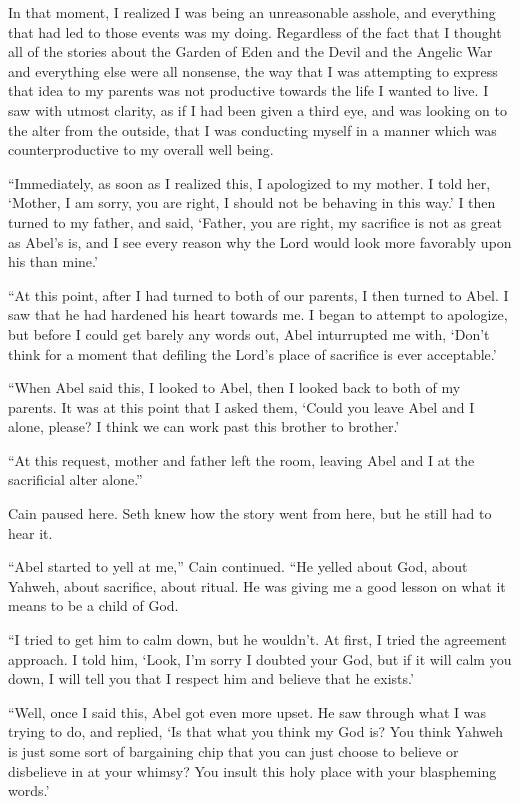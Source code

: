 \documentclass[12pt,twoside,titlepage]{report}
\begin{document}
In that moment, I realized I was being an unreasonable asshole, and
everything that had led to those events was my doing. Regardless of the
fact that I thought all of the stories about the Garden of Eden and the
Devil and the Angelic War and everything else were all nonsense, the way
that I was attempting to express that idea to my parents was not
productive towards the life I wanted to live. I saw with utmost clarity,
as if I had been given a third eye, and was looking on to the alter from
the outside, that I was conducting myself in a manner which was
counterproductive to my overall well being.

``Immediately, as soon as I realized this, I apologized to my mother. I
told her, `Mother, I am sorry, you are right, I should not be behaving
in this way.' I then turned to my father, and said, `Father, you are
right, my sacrifice is not as great as Abel's is, and I see every reason
why the Lord would look more favorably upon his than mine.'

``At this point, after I had turned to both of our parents, I then
turned to Abel. I saw that he had hardened his heart towards me. I began
to attempt to apologize, but before I could get barely any words out,
Abel inturrupted me with, `Don't think for a moment that defiling the
Lord's place of sacrifice is ever acceptable.'

``When Abel said this, I looked to Abel, then I looked back to both of
my parents. It was at this point that I asked them, `Could you leave
Abel and I alone, please? I think we can work past this brother to
brother.'

``At this request, mother and father left the room, leaving Abel and I
at the sacrificial alter alone.''

Cain paused here. Seth knew how the story went from here, but he still
had to hear it.

``Abel started to yell at me,'' Cain continued. ``He yelled about God,
about Yahweh, about sacrifice, about ritual. He was giving me a good
lesson on what it means to be a child of God.

``I tried to get him to calm down, but he wouldn't. At first, I tried
the agreement approach. I told him, `Look, I'm sorry I doubted your God,
but if it will calm you down, I will tell you that I respect him and
believe that he exists.'

``Well, once I said this, Abel got even more upset. He saw through what
I was trying to do, and replied, `Is that what you think my God is? You
think Yahweh is just some sort of bargaining chip that you can just
choose to believe or disbelieve in at your whimsy? You insult this holy
place with your blaspheming words.'
\end{document}
